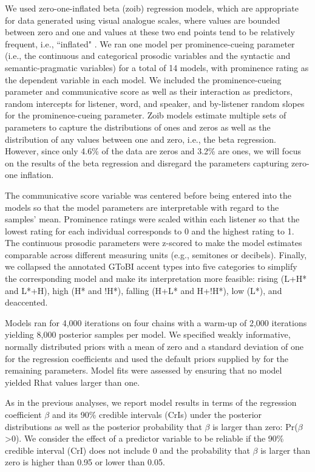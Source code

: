 We used zero-one-inflated beta (zoib) regression models, which are appropriate for data generated using visual analogue scales, where values are bounded between zero and one and values at these two end points tend to be relatively frequent, i.e., ``inflated" \citep{liuZoibPackageBayesian2015, vuorreHowAnalyzeVisual2019}. We ran one model per prominence-cueing parameter (i.e., the continuous and categorical prosodic variables and the syntactic and semantic-pragmatic variables) for a total of 14 models, with prominence rating as the dependent variable in each model. We included the prominence-cueing parameter and communicative score as well as their interaction as predictors, random intercepts for listener, word, and speaker, and by-listener random slopes for the prominence-cueing parameter. Zoib models estimate multiple sets of parameters to capture the distributions of ones and zeros as well as the distribution of any values between one and zero, i.e., the beta regression. However, since only 4.6\% of the data are zeros and 3.2\% are ones, we will focus on the results of the beta regression and disregard the parameters capturing zero-one inflation.

The communicative score variable was centered before being entered into the models so that the model parameters are interpretable with regard to the samples' mean. Prominence ratings were scaled within each listener so that the lowest rating for each individual corresponds to 0 and the highest rating to 1. The continuous prosodic parameters were z-scored to make the model estimates comparable across different measuring units (e.g., semitones or decibels). Finally, we collapsed the annotated GToBI accent types into five categories to simplify the corresponding model and make its interpretation more feasible: rising (L+H* and L*+H), high (H* and !H*), falling (H+L* and H+!H*), low (L*), and deaccented.

Models ran for 4,000 iterations on four chains with a warm-up of 2,000 iterations yielding 8,000 posterior samples per model. We specified weakly informative, normally distributed priors with a mean of zero and a standard deviation of one for the regression coefficients and used the default priors supplied by  for the remaining parameters. Model fits were assessed by ensuring that no model yielded Rhat values larger than one.

As in the previous analyses, we report model results in terms of the regression coefficient $\beta$ and its 90\% credible intervals (CrIs) under the posterior distributions as well as the posterior probability that $\beta$ is larger than zero: Pr($\beta$\textgreater{}0). We consider the effect of a predictor variable to be reliable if the 90\% credible interval (CrI) does not include 0 and the probability that $\beta$ is larger than zero is higher than 0.95 or lower than 0.05.

